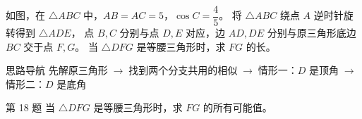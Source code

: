 \documentclass{exam-zh}
\begin{document}

\begin{eduProblemBlock}[第 18 题]
\noindent
\begin{minipage}[t]{\dimexpr\linewidth-70mm-6mm\relax}
\vspace{0pt}
如图，在 $\triangle ABC$ 中，$AB=AC=5$，$\cos C=\dfrac45$。
将 $\triangle ABC$ 绕点 $A$ 逆时针旋转得到 $\triangle ADE$，
点 $B,C$ 分别与点 $D,E$ 对应，边 $AD,DE$ 分别与原三角形底边 $BC$ 交于点 $F,G$。
当 $\triangle DFG$ 是等腰三角形时，求 $FG$ 的长。

\end{minipage}\hfill
\begin{diagramcoltikz}{70mm}{原图只给出 $\triangle ABC$；先由已知三角比解出底边。}
}
\end{diagramcoltikz}
\end{eduProblemBlock}





\begin{eduAuxItem}{思路导航}
先解原三角形$\;\to\;$找到两个分支共用的相似$\;\to\;$情形一：$D$ 是顶角$\;\to\;$情形二：$D$ 是底角\end{eduAuxItem}




\begin{eduSubQuestionItem}{第 18 题}
当 $\triangle DFG$ 是等腰三角形时，求 $FG$ 的所有可能值。\end{eduSubQuestionItem}
\end{document}
